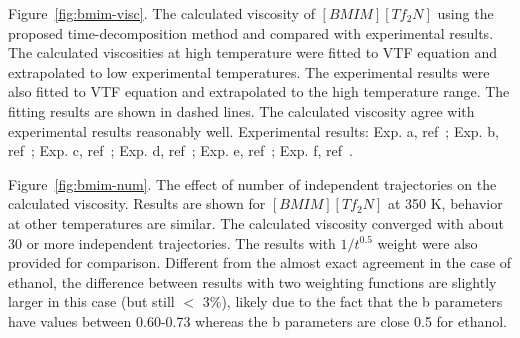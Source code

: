 \documentclass[12pt]{article}
\begin{document}
Figure~\ref{fig:bmim-visc}.
The calculated viscosity of $[BMIM][Tf_2N]$ using the proposed time-decomposition method
and compared with experimental results.
The calculated viscosities at high temperature were fitted to VTF equation
and extrapolated to low experimental temperatures.
The experimental results were also fitted to VTF equation
and extrapolated to the high temperature range.
The fitting results are shown in dashed lines.
The calculated viscosity agree with experimental results reasonably well.
Experimental results: 
Exp. a, ref~\cite{Gadzuric.JCED.57.1072.2012};
Exp. b, ref~\cite{Katsuta.JCED.55.1588.2010};
Exp. c, ref~\cite{Watanabe.JPCB.110.19593.2006};
Exp. d, ref~\cite{Majer.GC.8.172.2006};
Exp. e, ref~\cite{Watanabe.JPCB.109.6103.2005};
Exp. f, ref~\cite{VanderNoot.JEC.568.167.2004}.

Figure~\ref{fig:bmim-num}.
The effect of number of independent trajectories on the calculated viscosity.
Results are shown for $[BMIM][Tf_2N]$ at 350 K, behavior at other temperatures are similar.
The calculated viscosity converged with about 30 or more independent trajectories.
The results with $1/t^{0.5}$ weight were also provided for comparison.
Different from the almost exact agreement in the case of ethanol,
the difference between results with two weighting functions are slightly larger in this case
(but still $<$ 3\%),
likely due to the fact that the b parameters have values between 0.60-0.73
whereas the b parameters are close 0.5 for ethanol.




\newpage
\clearpage
\begin{figure}
\begin{center}
\caption{}
\label{fig:visc-longtraj}
\end{center}
\end{figure}

\newpage
\clearpage
\begin{figure}
\begin{center}
\caption{}
\label{fig:density}
\end{center}
\end{figure}
\end{document}
